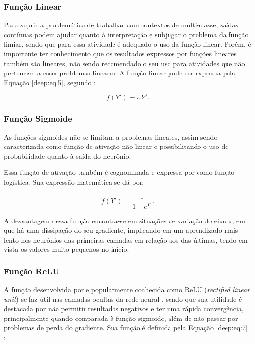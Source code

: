 \subsubsection{Função Linear}
Para suprir a problemática de trabalhar com contextos de multi-classe, saídas contínuas podem ajudar quanto à interpretação e subjugar o problema da função limiar, sendo que para essa atividade é adequado o uso da função linear. Porém, é importante ter conhecimento que os resultados expressos por funções lineares também são lineares, não sendo recomendado o seu uso para atividades que não pertencem a esses problemas lineares. A função linear pode ser expressa pela Equação \ref{deep:eq:5}, segundo \cite{Rosenblatt1958}:

\begin{equation}
    \label{deep:eq:5}
    f(Y') = \alpha Y'.
\end{equation}


\subsubsection{Função Sigmoide}
As funções sigmoides não se limitam a problemas lineares, assim sendo caracterizada como função de ativação não-linear e possibilitando o uso de probabilidade quanto à saída do neurônio.

Essa função de ativação também é cognominada e expressa por \cite{glorot2011deep} como função logística. Sua expressão matemática se dá por:

\begin{equation}
    \label{deep:eq:6}
    f(Y') = \frac{1}{1 + e^{Y'}}.
\end{equation}

A desvantagem dessa função encontra-se em situações de variação do eixo x, em que há uma  dissipação do seu gradiente, implicando em um aprendizado mais lento nos neurônios das primeiras camadas em relação aos das últimas, tendo em vista os valores muito pequenos no início.

\subsubsection{Função ReLU}
A função desenvolvida por \cite{Hahnioser2000} e popularmente conhecida como ReLU (\textit{rectified linear unit}) se faz útil nas camadas ocultas da rede neural \cite{Goodfellow2016}, sendo que sua utilidade é destacada por não permitir resultados negativos \cite{Dahl2013} e ter uma rápida convergência, principalmente quando comparada à função sigmoide, além de não passar por problemas de perda do gradiente. Sua função é definida pela Equação \ref{deep:eq:7} \cite{Hahnioser2000}:

